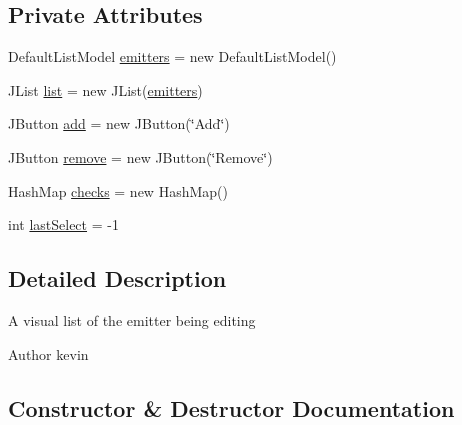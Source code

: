 \subsection*{Private Attributes}
\begin{DoxyCompactItemize}
\item 
Default\+List\+Model \mbox{\hyperlink{classorg_1_1newdawn_1_1slick_1_1tools_1_1peditor_1_1_emitter_list_af49e1d51ea3ee483a77a30ce7aaa6d89}{emitters}} = new Default\+List\+Model()
\item 
J\+List \mbox{\hyperlink{classorg_1_1newdawn_1_1slick_1_1tools_1_1peditor_1_1_emitter_list_a201acbbfa375f50045f4f87452a9c722}{list}} = new J\+List(\mbox{\hyperlink{classorg_1_1newdawn_1_1slick_1_1tools_1_1peditor_1_1_emitter_list_af49e1d51ea3ee483a77a30ce7aaa6d89}{emitters}})
\item 
J\+Button \mbox{\hyperlink{classorg_1_1newdawn_1_1slick_1_1tools_1_1peditor_1_1_emitter_list_a8917d12ded4e0e597c9ef64fa7812aee}{add}} = new J\+Button(\char`\"{}Add\char`\"{})
\item 
J\+Button \mbox{\hyperlink{classorg_1_1newdawn_1_1slick_1_1tools_1_1peditor_1_1_emitter_list_ac7b91624c7504f3ea8fb21a71aba6b48}{remove}} = new J\+Button(\char`\"{}Remove\char`\"{})
\item 
Hash\+Map \mbox{\hyperlink{classorg_1_1newdawn_1_1slick_1_1tools_1_1peditor_1_1_emitter_list_ab4a9e11fc917db0ed6c38a4980a8ee4c}{checks}} = new Hash\+Map()
\item 
int \mbox{\hyperlink{classorg_1_1newdawn_1_1slick_1_1tools_1_1peditor_1_1_emitter_list_a65e90671226a94c9d05cae2c3bfd7728}{last\+Select}} = -\/1
\end{DoxyCompactItemize}


\subsection{Detailed Description}
A visual list of the emitter being editing

\begin{DoxyAuthor}{Author}
kevin 
\end{DoxyAuthor}


\subsection{Constructor \& Destructor Documentation}
\mbox{\label{classorg_1_1newdawn_1_1slick_1_1tools_1_1peditor_1_1_emitter_list_a975c297ae89d721d63d06fd7b4c6412d}} 
